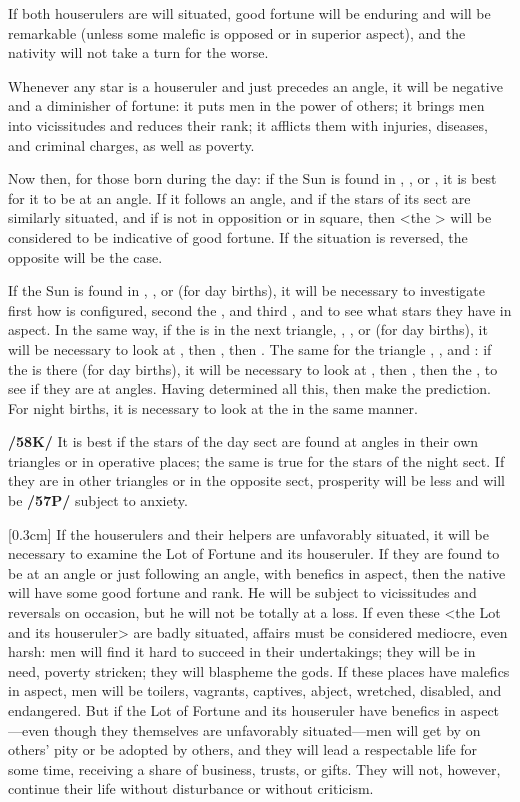If both houserulers are will situated, good fortune will be enduring and will be remarkable (unless some malefic is opposed or in superior aspect), and the nativity will not take a turn for the worse. 

Whenever any star is a houseruler and just precedes an angle, it will be negative and a diminisher of fortune: it puts men in the power of others; it brings men into vicissitudes and reduces their rank; it afflicts them with injuries, diseases, and criminal charges, as well as poverty.

Now then, for those born during the day: if the Sun is found in \Aries, \Leo, or \Sagittarius, it is best for it to be at an angle. If it follows an angle, and if the stars of its sect are similarly situated, and if \Mars\xspace is not in opposition or in square, then <the \Sun> will be considered to be indicative of good fortune. If the situation is reversed, the opposite will be the case. 

If the Sun is found in \Taurus, \Virgo, or \Capricorn\xspace (for day births), it will be necessary to investigate first how \Venus\xspace is configured, second the \Moon, and third
\Mars, and to see what stars they have in aspect. In the same way, if the \Sun\xspace is in the next triangle, \Gemini, \Libra, or \Aquarius\xspace (for day births), it will be necessary to look at \Saturn, then \Mercury, then \Jupiter. The same for the triangle \Cancer, \Scorpio, and \Pisces: if the \Sun\xspace is there (for day births), it will be necessary to look at \Venus, then \Mars, then the \Moon, to see if they are at angles. Having determined all this, then make the prediction. For night births, it is necessary to look at the \Moon\xspace in the same manner.

\mndl[0.2cm]
\textbf{/58K/} It is best if the stars of the day sect are found at angles in their own triangles or in operative
places; the same is true for the stars of the night sect. If they are in other triangles or in the opposite sect, prosperity will be less and will be \textbf{/57P/} subject to anxiety. 

\marginnote{\Fortune}[0.3cm]
If the houserulers and their helpers are unfavorably situated, it will be necessary to examine the Lot of Fortune and its houseruler. If they are found to be at an angle or just following an angle, with benefics in aspect, then the native will have some good fortune and rank. He will be subject to vicissitudes and reversals on occasion, but he will not be
totally at a loss. If even these <the Lot and its houseruler> are badly situated, affairs must be considered
mediocre, even harsh: men will find it hard to succeed in their undertakings; they will be in need, poverty stricken;
they will blaspheme the gods. If these places have malefics in aspect, men will be toilers, vagrants, captives, abject, wretched, disabled, and endangered. But if the Lot of Fortune and its houseruler have benefics in aspect—even though they themselves are unfavorably situated—men will get by on others’
pity or be adopted by others, and they will lead a respectable life for some time, receiving a share of business, trusts, or gifts. They will not, however, continue their life without disturbance or without criticism.

